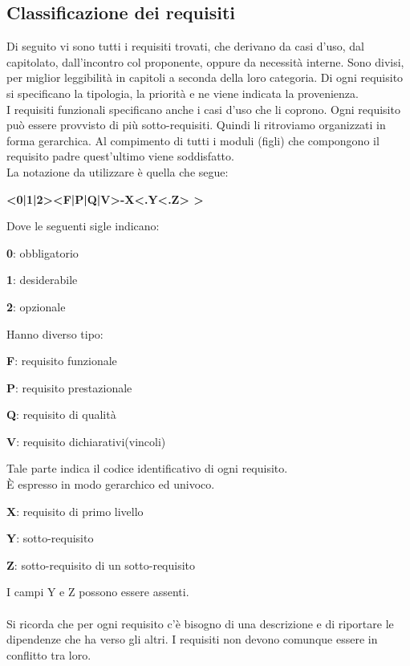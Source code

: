 \documentclass[12pt,a4paper,titlepage]{article}
\begin{document}
	\subsection{Classificazione dei requisiti}
	Di seguito vi sono tutti i requisiti trovati, che derivano da casi d'uso, dal capitolato, dall'incontro col proponente, oppure da necessità interne. Sono divisi, per miglior leggibilità in capitoli a seconda della loro categoria. Di ogni requisito si specificano la tipologia, la priorità e ne viene indicata la provenienza. \\
	I requisiti funzionali specificano anche i casi d'uso che li coprono. Ogni requisito può essere provvisto di più sotto-requisiti. Quindi li ritroviamo organizzati in forma gerarchica. Al compimento di tutti i moduli (figli) che compongono il requisito padre quest'ultimo viene soddisfatto.\\
	La notazione da utilizzare è quella che segue:
	\begin{center}
		\textbf{ <0|1|2><F|P|Q|V>-X<.Y<.Z> > }
	\end{center}
	Dove le seguenti sigle indicano:
	\begin{trivlist}
		\item \textbf{0}: obbligatorio
		\item \textbf{1}: desiderabile
		\item \textbf{2}: opzionale
	\end{trivlist} 
	Hanno diverso tipo:
	\begin{trivlist}
		\item \textbf{F}: requisito funzionale
		\item \textbf{P}: requisito prestazionale
		\item \textbf{Q}: requisito di qualità
		\item \textbf{V}: requisito dichiarativi(vincoli)
	\end{trivlist} 
	Tale parte indica il codice identificativo di ogni requisito.\\
	È espresso in modo gerarchico ed univoco.
	\begin{trivlist}
		\item \textbf{X}: requisito di primo livello
		\item \textbf{Y}: sotto-requisito
		\item \textbf{Z}: sotto-requisito di un sotto-requisito
	\end{trivlist} 
	I campi Y e Z possono essere assenti.\\
	\\
	Si ricorda che per ogni requisito c'è bisogno di una descrizione e di riportare le dipendenze che ha verso gli altri. I requisiti non devono comunque essere in conflitto tra loro.
	\newpage
\end{document}
